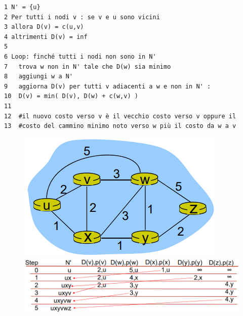 \documentclass[11pt,a4paper,oneside]{book}
\theoremstyle{definition}
\begin{document}
\begin{verbatim}
1 N' = {u}
2 Per tutti i nodi v : se v e u sono vicini
3 allora D(v) = c(u,v)
4 altrimenti D(v) = inf
5
6 Loop: finché tutti i nodi non sono in N'
7 	trova w non in N' tale che D(w) sia minimo
8 	aggiungi w a N'
9 	aggiorna D(v) per tutti v adiacenti a w e non in N' :
10 	D(v) = min( D(v), D(w) + c(w,v) )
11
12 	#il nuovo costo verso v è il vecchio costo verso v oppure il
13 	#costo del cammino minimo noto verso w più il costo da w a v 
\end{verbatim}
\begin{figure}[!h]
	\centering
	\includegraphics[scale=0.3]{Immagini/Dk2.png}
	\includegraphics[scale=0.3]{Immagini/Dk.png}
\end{figure}
\end{document}
